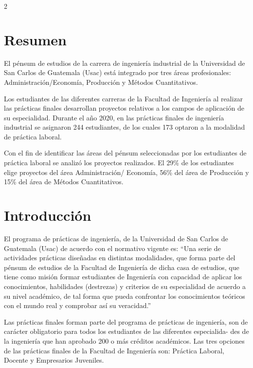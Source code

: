 \documentclass[12pt,spanish,Letterpaper,openany]{book}
\begin{document}
\begin {multicols}{2}

\hypertarget{resumen}{%
\section{Resumen}\label{resumen}}

El pénsum de estudios de la carrera de ingeniería industrial de la Universidad de San Carlos de Guatemala (Usac) está integrado por tres áreas profesionales: Administración/Economía, Producción y Métodos Cuantitativos.

Los estudiantes de las diferentes carreras de la Facultad de Ingeniería al realizar las prácticas finales desarrollan proyectos relativos a los campos de aplicación de su especialidad. Durante el año 2020, en las prácticas finales de ingeniería industrial se asignaron 244 estudiantes, de los cuales 173 optaron a la modalidad de práctica laboral.

Con el fin de identificar las áreas del pénsum seleccionadas por los estudiantes de práctica laboral se analizó los proyectos realizados. El 29\% de los estudiantes elige proyectos del área Administración/ Economía, 56\% del área de Producción y 15\% del área de Métodos Cuantitativos.

\hypertarget{introducciuxf3n-1}{%
\section{Introducción}\label{introducciuxf3n-1}}

El programa de prácticas de ingeniería, de la Universidad de San Carlos de Guatemala (Usac) de acuerdo con el normativo vigente es: ``Una serie de actividades prácticas diseñadas en distintas modalidades, que forma parte del pénsum de estudios de la Facultad de Ingeniería de dicha casa de estudios, que tiene como misión formar estudiantes de Ingeniería con capacidad de aplicar los conocimientos, habilidades (destrezas) y criterios de su especialidad de acuerdo a su nivel académico, de tal forma que pueda confrontar los conocimientos teóricos con el mundo real y comprobar así su veracidad.''

Las prácticas finales forman parte del programa de
prácticas de ingeniería, son de carácter obligatorio
para todos los estudiantes de las diferentes
especialida-
des de la ingeniería que han aprobado
200 o más créditos académicos. Las tres opciones de
las prácticas finales de la Facultad de Ingeniería
son: Práctica Laboral, Docente y Empresarios
Juveniles.


\end{multicols}
\end{document}
